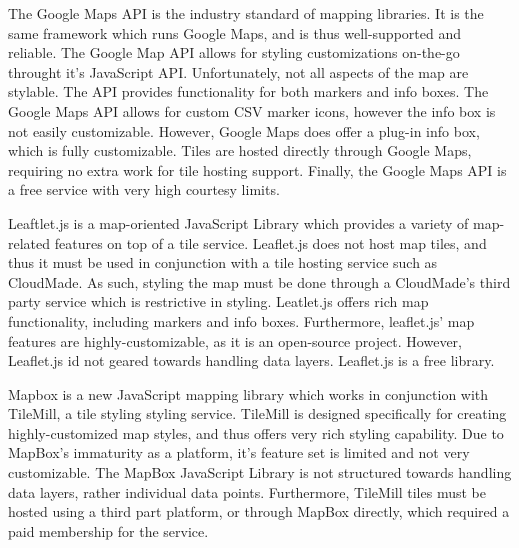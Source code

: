 \documentclass{report}
\begin{document}
The Google Maps API is the industry standard of mapping libraries. It is the same framework which runs Google Maps, and is thus well-supported and reliable. The Google Map API allows for styling customizations on-the-go throught it's JavaScript API. Unfortunately, not all aspects of the map are stylable. The API provides functionality for both markers and info boxes. The Google Maps API allows for custom CSV marker icons, however the info box is not easily customizable. However, Google Maps does offer a plug-in info box, which is fully customizable. Tiles are hosted directly through Google Maps, requiring no extra work for tile hosting support. Finally, the Google Maps API is a free service with very high courtesy limits.

Leaftlet.js is a map-oriented JavaScript Library which provides a variety of map-related features on top of a tile service. Leaflet.js does not host map tiles, and thus it must be used in conjunction with a tile hosting service such as CloudMade. As such, styling the map must be done through a CloudMade's third party service which is restrictive in styling. Leatlet.js offers rich map functionality, including markers and info boxes. Furthermore, leaflet.js' map features are highly-customizable, as it is an open-source project. However, Leaflet.js id not geared towards handling data layers. Leaflet.js is a free library.

Mapbox is a new JavaScript mapping library which works in conjunction with TileMill, a tile styling styling service. TileMill is designed specifically for creating highly-customized map styles, and thus offers very rich styling capability. Due to MapBox's immaturity as a platform, it's feature set is limited and not very customizable. The MapBox JavaScript Library is not structured towards handling data layers, rather individual data points. Furthermore, TileMill tiles must be hosted using a third part platform, or through MapBox directly, which required a paid membership for the service.
\end{document}

